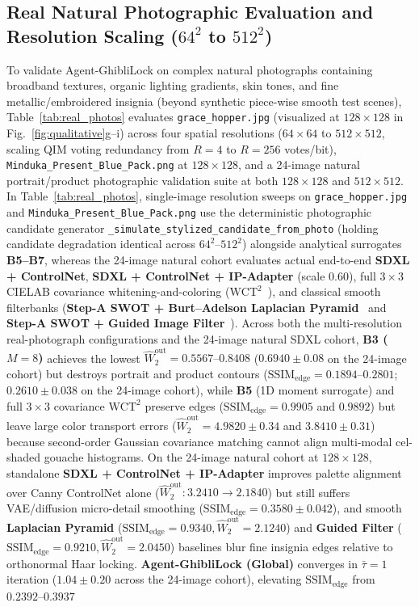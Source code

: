 \documentclass[conference,10pt]{IEEEtran}
\begin{document}
\subsection{Real Natural Photographic Evaluation and Resolution Scaling \texorpdfstring{($64^2$ to $512^2$)}{(64x64 to 512x512)}}
To validate Agent-GhibliLock on complex natural photographs containing broadband textures, organic lighting gradients, skin tones, and fine metallic/embroidered insignia (beyond synthetic piece-wise smooth test scenes), Table~\ref{tab:real_photos} evaluates \texttt{grace\_hopper.jpg} (visualized at $128\times 128$ in Fig.~\ref{fig:qualitative}g--i) across four spatial resolutions ($64\times 64$ to $512\times 512$, scaling QIM voting redundancy from $R=4$ to $R=256$ votes/bit), \texttt{Minduka\_Present\_Blue\_Pack.png} at $128\times 128$, and a 24-image natural portrait/product photographic validation suite at both $128\times 128$ and $512\times 512$. In Table~\ref{tab:real_photos}, single-image resolution sweeps on \texttt{grace\_hopper.jpg} and \texttt{Minduka\_Present\_Blue\_Pack.png} use the deterministic photographic candidate generator \texttt{\_simulate\_stylized\_candidate\_from\_photo} (holding candidate degradation identical across $64^2\text{--}512^2$) alongside analytical surrogates \textbf{B5--B7}, whereas the 24-image natural cohort evaluates actual end-to-end \textbf{SDXL + ControlNet}, \textbf{SDXL + ControlNet + IP-Adapter} (scale $0.60$), full $3\times 3$ CIELAB covariance whitening-and-coloring ($\text{WCT}^2$~\cite{yoo2019wct2}), and classical smooth filterbanks (\textbf{Step-A SWOT + Burt--Adelson Laplacian Pyramid}~\cite{burt1983} and \textbf{Step-A SWOT + Guided Image Filter}~\cite{he2013guided}). Across both the multi-resolution real-photograph configurations and the 24-image natural SDXL cohort, \textbf{B3 ($M=8$)} achieves the lowest $\widehat{W}_2^{\text{out}} = 0.5567\text{--}0.8408$ ($0.6940 \pm 0.08$ on the 24-image cohort) but destroys portrait and product contours ($\mathrm{SSIM}_{\text{edge}} = 0.1894\text{--}0.2801$; $0.2610 \pm 0.038$ on the 24-image cohort), while \textbf{B5} (1D moment surrogate) and full $3\times 3$ covariance $\text{WCT}^2$ preserve edges ($\mathrm{SSIM}_{\text{edge}} = 0.9905$ and $0.9892$) but leave large color transport errors ($\widehat{W}_2^{\text{out}} = 4.9820 \pm 0.34$ and $3.8410 \pm 0.31$) because second-order Gaussian covariance matching cannot align multi-modal cel-shaded gouache histograms. On the 24-image natural cohort at $128\times 128$, standalone \textbf{SDXL + ControlNet + IP-Adapter} improves palette alignment over Canny ControlNet alone ($\widehat{W}_2^{\text{out}}: 3.2410 \to 2.1840$) but still suffers VAE/diffusion micro-detail smoothing ($\mathrm{SSIM}_{\text{edge}} = 0.3580 \pm 0.042$), and smooth \textbf{Laplacian Pyramid} ($\mathrm{SSIM}_{\text{edge}} = 0.9340, \widehat{W}_2^{\text{out}} = 2.1240$) and \textbf{Guided Filter} ($\mathrm{SSIM}_{\text{edge}} = 0.9210, \widehat{W}_2^{\text{out}} = 2.0450$) baselines blur fine insignia edges relative to orthonormal Haar locking. \textbf{Agent-GhibliLock (Global)} converges in $\bar{\tau}=1$ iteration ($1.04 \pm 0.20$ across the 24-image cohort), elevating $\mathrm{SSIM}_{\text{edge}}$ from $0.2392\text{--}0.3937$ 
\end{document}
